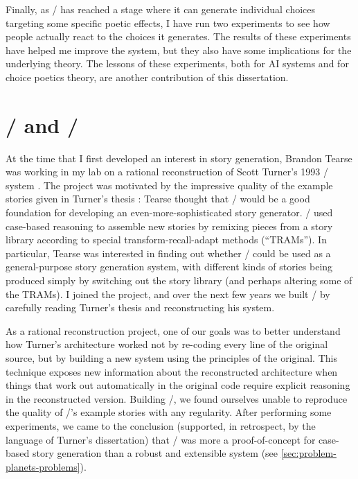 Finally, as \dunyazad/ has reached a stage where it can generate individual choices targeting some specific poetic effects, I have run two experiments to see how people actually react to the choices it generates.
%
The results of these experiments have helped me improve the system, but they also have some implications for the underlying theory.
%
The lessons of these experiments, both for AI systems and for choice poetics theory, are another contribution of this dissertation.



\section{\minstrel/ and \skald/}

At the time that I first developed an interest in story generation, Brandon Tearse was working in my lab on a rational reconstruction of Scott Turner's 1993 \minstrel/ system \citep{Turner1993}.
%
The project was motivated by the impressive quality of the example stories given in Turner's thesis \citep{Turner1993}: Tearse thought that \minstrel/ would be a good foundation for developing an even-more-sophisticated story generator.
%
\minstrel/ used case-based reasoning to assemble new stories by remixing pieces from a story library according to special transform-recall-adapt methods (``TRAMs'').
%
In particular, Tearse was interested in finding out whether \minstrel/ could be used as a general-purpose story generation system, with different kinds of stories being produced simply by switching out the story library (and perhaps altering some of the TRAMs).
%
I joined the project, and over the next few years we built \skald/ by carefully reading Turner's thesis and reconstructing his system.


As a rational reconstruction project, one of our goals was to better understand how Turner's architecture worked not by re-coding every line of the original source, but by building a new system using the principles of the original.
%
This technique exposes new information about the reconstructed architecture when things that work out automatically in the original code require explicit reasoning in the reconstructed version.
%
Building \skald/, we found ourselves unable to reproduce the quality of \minstrel/'s example stories with any regularity.
%
After performing some experiments, we came to the conclusion (supported, in retrospect, by the language of Turner's dissertation) that \minstrel/ was more a proof-of-concept for case-based story generation than a robust and extensible system (see \cref{sec:problem-planets-problems}).


